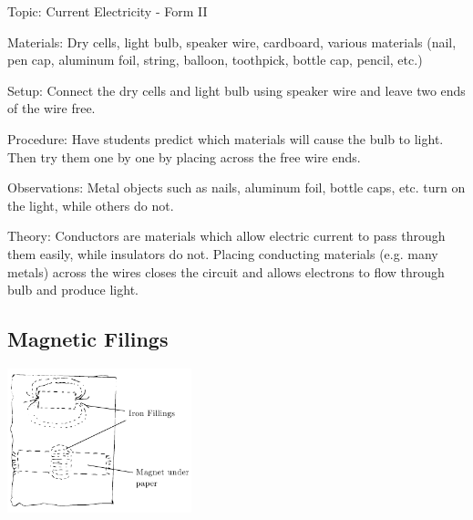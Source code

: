 \begin{multicols}{2}
\begin{description*}
\item[Topic:]{Current Electricity - Form II}
\item[Materials:]{Dry cells, light bulb, speaker wire, cardboard, various materials (nail, pen cap, aluminum foil, string, balloon, toothpick, bottle cap, pencil, etc.)}
\item[Setup:]{Connect the dry cells and light bulb using speaker wire and leave two ends of the wire free.}
\item[Procedure:]{Have students predict which materials will cause the bulb to light. Then try them one by one by placing across the free wire ends.}
\item[Observations:]{Metal objects such as nails, aluminum foil, bottle caps, etc. turn on the light, while others do not.}
\item[Theory:]{Conductors are materials which allow electric current to pass through them easily, while insulators do not. Placing conducting materials (e.g. many metals) across the wires closes the circuit and allows electrons to flow through bulb and produce light.}
\end{description*}

\subsection{Magnetic Filings}

\begin{center}
\includegraphics[width=0.4\textwidth]{./img/magnetic-fields.png}
\end{center}


\end{multicols}

